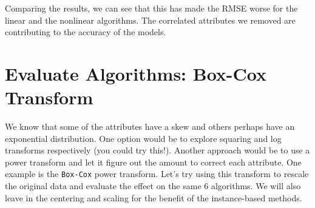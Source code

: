 \documentclass[]{book}
\begin{document}
Comparing the results, we can see that this has made the RMSE worse for the linear and the nonlinear algorithms. The correlated attributes we removed are contributing to the accuracy of the models.

\hypertarget{evaluate-algorithms-box-cox-transform}{%
\section{Evaluate Algorithms: Box-Cox Transform}\label{evaluate-algorithms-box-cox-transform}}

We know that some of the attributes have a skew and others perhaps have an
exponential distribution. One option would be to explore squaring and log
transforms respectively (you could try this!). Another approach would be to use a power transform and let it figure out the amount to correct each attribute. One example is the \texttt{Box-Cox} power transform. Let's try using this transform to rescale the original data and evaluate the effect on the same 6 algorithms. We will also leave in the centering and scaling for the benefit of the instance-based methods.
\end{document}
